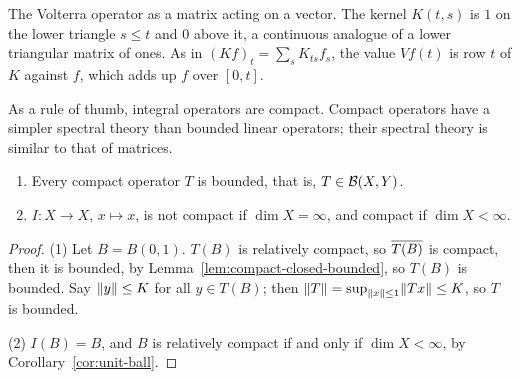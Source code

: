 \begin{nfigure}{The Volterra operator as a matrix acting on a vector. The kernel
$K(t,s)$ is $1$ on the lower triangle $s \le t$ and $0$ above it, a
continuous analogue of a lower triangular matrix of ones. As in
$(Kf)_t = \sum_s K_{ts} f_s$, the value $Vf(t)$ is row $t$ of $K$ against
$f$, which adds up $f$ over $[0, t]$.}
\end{nfigure}

\begin{remark}
As a rule of thumb, integral operators are compact. Compact operators have a
simpler spectral theory than bounded linear operators; their spectral theory
is similar to that of matrices.
\end{remark}

\begin{lemma}\label{lem:compact-basic}
\leavevmode
\begin{enumerate}
  \item Every compact operator $T$ is bounded, that is,
    $T \in \mathcal{B}(X, Y)$.
  \item $I \colon X \to X$, $x \mapsto x$, is not compact if
    $\dim X = \infty$, and compact if $\dim X < \infty$.
\end{enumerate}
\end{lemma}

\begin{proof}
(1) Let $B = B(0,1)$. $T(B)$ is relatively compact, so $\overline{T(B)}$ is
compact, then it is bounded, by Lemma~\ref{lem:compact-closed-bounded}, so
$T(B)$ is bounded. Say $\lVert y\rVert \le K$ for all $y \in T(B)$; then
$\lVert T\rVert = \sup_{\lVert x\rVert \le 1} \lVert Tx\rVert \le K$, so $T$ is bounded.

(2) $I(B) = B$, and $B$ is relatively compact if and only if
$\dim X < \infty$, by Corollary~\ref{cor:unit-ball}.
\end{proof}

